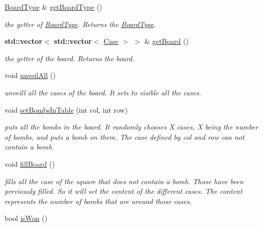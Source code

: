 \begin{DoxyCompactItemize}
\hyperlink{struct_board_type}{Board\+Type} \& \hyperlink{class_board_a30189580d1e2627fc32b40a33db9c5a5}{get\+Board\+Type} ()
\begin{DoxyCompactList}\small\item\em the getter of \hyperlink{struct_board_type}{Board\+Type}. Returns the \hyperlink{struct_board_type}{Board\+Type}. \end{DoxyCompactList}\item 
\textbf{ std\+::vector}$<$ \textbf{ std\+::vector}$<$ \hyperlink{class_case}{Case} $>$ $>$ \& \hyperlink{class_board_af801e2935f37e23a3714d034e231a5ba}{get\+Board} ()
\begin{DoxyCompactList}\small\item\em the getter of the board. Returns the board. \end{DoxyCompactList}\item 
\mbox{\label{class_board_a305b154a3ac53d119fc78efe053f4745}} 
void \hyperlink{class_board_a305b154a3ac53d119fc78efe053f4745}{unveil\+All} ()
\begin{DoxyCompactList}\small\item\em unveill all the cases of the board. It sets to visible all the cases. \end{DoxyCompactList}\item 
void \hyperlink{class_board_a182d0e797d7482a9091989b16dbcbee9}{set\+Bombs\+In\+Table} (int col, int row)
\begin{DoxyCompactList}\small\item\em puts all the bombs in the board. It randomly chooses X cases, X being the number of bombs, and puts a bomb on them. The case defined by col and row can not contain a bomb. \end{DoxyCompactList}\item 
\mbox{\label{class_board_ada048789b3d9e13aaa52f4b8d1a72b50}} 
void \hyperlink{class_board_ada048789b3d9e13aaa52f4b8d1a72b50}{fill\+Board} ()
\begin{DoxyCompactList}\small\item\em fills all the case of the square that does not contain a bomb. Those have been previously filled. So it will set the content of the different cases. The content represents the number of bombs that are around those cases. \end{DoxyCompactList}\item 
bool \hyperlink{class_board_a472731150e19ecdd2d71bcc098037eb8}{is\+Won} ()

\end{DoxyCompactItemize}
